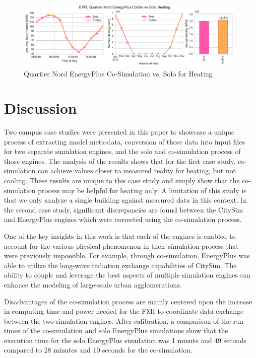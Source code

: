 \documentclass{tBPS2e}
\theoremstyle{plain}
\theoremstyle{definition}
\theoremstyle{remark}
\begin{document}
\begin{figure}[H]
\centering
\includegraphics[scale=0.55]{figures/QN_EnergyPlus_Heating}
\caption{Quartier Nord EnergyPlus Co-Simulation vs. Solo for Heating}
\label{fig:qn_eplus_cosimvssolo_heating}
\end{figure}


\section{Discussion}
Two campus case studies were presented in this paper to showcase a unique process of extracting model meta-data, conversion of those data into input files for two separate simulation engines, and the solo
and co-simulation process of those engines. The analysis of the results shows that for the first case study, co-simulation can achieve values closer to measured reality for heating, but not cooling. 
These results are unique to this case study and simply show that the co-simulation process may be helpful for heating only. A limitation of this study is that we only analyze a single building against measured data in this
context. In the second case study, significant discrepancies are found between the CitySim and EnergyPlus engines which were corrected using the co-simulation process.

One of the key insights in this work is that each of the engines is enabled to account for the various 
physical phenomenon in their simulation process that were previously impossible. For example, 
through co-simulation, EnergyPlus was able to utilize the long-wave radiation exchange capabilities 
of CitySim. The ability to couple and leverage the best aspects of multiple simulation
engines can enhance the modeling of large-scale urban agglomerations. 

Disadvantages of the co-simulation process are mainly centered upon the increase
in computing time and power needed for the FMI to coordinate data exchange between 
the two simulation engines. After calibration, a comparison of the run-times of the co-simulation and solo EnergyPlus
simulations show that the execution time for the solo EnergyPlus simulation was 1 minute and 49 seconds compared to 28 minutes and 10 seconds for the co-simulation. 
\end{document}
